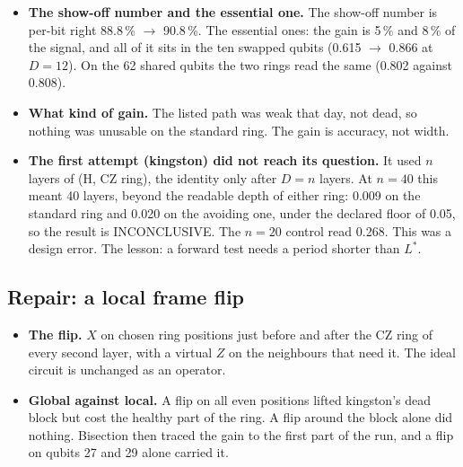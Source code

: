 \documentclass[11pt]{article}
\begin{document}
\begin{itemize}
\item \textbf{The show-off number and the essential one.} The show-off number is per-bit right 88.8\,\% $\to$
  90.8\,\%. The essential ones: the gain is 5\,\% and 8\,\% of the signal, and all of it sits in the ten swapped
  qubits (0.615 $\to$ 0.866 at $D=12$). On the 62 shared qubits the two rings read the same (0.802 against 0.808).
\item \textbf{What kind of gain.} The listed path was weak that day, not dead, so nothing was unusable on the standard
  ring. The gain is accuracy, not width.
\item \textbf{The first attempt (kingston) did not reach its question.} It used $n$ layers of (H, CZ ring), the
  identity only after $D=n$ layers. At $n=40$ this meant 40 layers, beyond the readable depth of either ring: 0.009 on
  the standard ring and 0.020 on the avoiding one, under the declared floor of 0.05, so the result is INCONCLUSIVE.
  The $n=20$ control read 0.268. This was a design error. The lesson: a forward test needs a period shorter than $L^*$.
\end{itemize}

\subsection{Repair: a local frame flip}\label{sec:repair}

\begin{itemize}
\item \textbf{The flip.} $X$ on chosen ring positions just before and after the CZ ring of every second layer, with a
  virtual $Z$ on the neighbours that need it. The ideal circuit is unchanged as an operator.
\item \textbf{Global against local.} A flip on all even positions lifted kingston's dead block but cost the healthy
  part of the ring. A flip around the block alone did nothing. Bisection then traced the gain to the first part of the
  run, and a flip on qubits 27 and 29 alone carried it.
\end{itemize}
\end{document}
